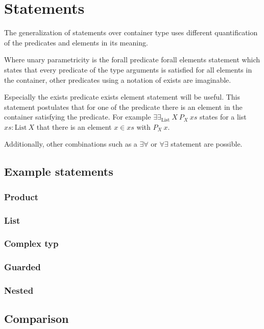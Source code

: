 \section{Statements}
The generalization of statements over container type uses different quantification
of the predicates and elements in its meaning.

Where unary parametricity is the forall predicate forall elements statement
which states that every predicate of the type arguments is satisfied for 
all elements in the container, other predicates using a notation
of exists are imaginable.

Especially the exists predicate exists element statement will be useful.
This statement postulates that for one of the predicate there is 
an element in the container satisfying the predicate.
For example $\exists\exists_{\text{List}}~X~P_X~xs$ states for a list $xs:\text{List}~X$
that there is an element $x\in xs$ with $P_X~x$.

Additionally, other combinations such as a $\exists\forall$ or $\forall\exists$ statement
are possible.

\subsection{Example statements}

\subsubsection{Product}

\subsubsection{List}

\subsubsection{Complex typ}

\subsubsection{Guarded}

\subsubsection{Nested}


\subsection{Comparison}

